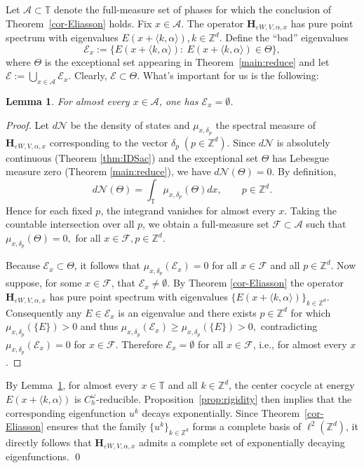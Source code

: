 \documentclass[reqno,11pt]{amsart}
\newtheorem{lemma}{Lemma}[section]
\begin{document}
Let $\mathcal{A}\subset\mathbb{T}$ denote the full-measure set of phases
for which the conclusion of Theorem~\ref{cor-Eliasson} holds.
Fix $x\in \mathcal{A}$. The operator $\mathbf H_{\varepsilon W,V,\alpha,x}$ has pure point spectrum with eigenvalues
$E(x+\langle k,\alpha\rangle), k\in\mathbb{Z}^d.$
Define the ``bad'' eigenvalues
$$\mathcal{E}_x:=\{E(x+\langle k,\alpha\rangle):\ E(x+\langle k,\alpha\rangle)\in\Theta\},$$
where $\Theta$ is the exceptional set appearing in Theorem~\ref{main:reduce} and 
let
 $\mathcal{E}:=\bigcup_{x\in\mathcal{A}}\mathcal{E}_x.$
Clearly, $\mathcal{E}\subset \Theta$. What's important for us is the following: 

\begin{lemma}\label{nonreducible}
    For almost every $x\in\mathcal{A}$, one has $\mathcal{E}_x = \emptyset$.
\end{lemma}

\begin{proof}
Let $d\mathcal{N}$ be the density of states and $\mu_{x,\delta_p}$ the spectral measure of
$\mathbf{H}_{\varepsilon W,V,\alpha,x}$  corresponding to the vector $\delta_p\;(p\in\mathbb{Z}^d)$.
Since $d\mathcal{N}$ is absolutely continuous (Theorem \ref{thm:IDSac}) and the exceptional set
$\Theta$ has Lebesgue measure zero (Theorem \ref{main:reduce}), we have $d\mathcal{N}(\Theta)=0$.  By definition,
$$
d\mathcal{N}(\Theta) = \int_{\mathbb{T}} \mu_{x,\delta_p}(\Theta) dx,
\qquad p\in\mathbb{Z}^d.
$$
Hence for each fixed $p$, the integrand vanishes for almost every $x$. Taking the
countable intersection over all $p$, we obtain a full‑measure set
$\mathcal{F}\subset\mathcal{A}$ such that
$\mu_{x,\delta_p}(\Theta) = 0, $ for all $ x\in\mathcal{F}, p\in\mathbb{Z}^d.$

Because $\mathcal{E}_x\subset\Theta$, it follows that
$\mu_{x,\delta_p}(\mathcal{E}_x)=0$ for all $x\in\mathcal{F}$ and all $p\in\mathbb{Z}^d$.
Now suppose, for some $x\in\mathcal{F}$, that $\mathcal{E}_x\neq\emptyset$. 
By Theorem \ref{cor-Eliasson} the operator $\mathbf{H}_{\varepsilon W,V,\alpha,x}$  has pure point
spectrum with eigenvalues $\{E(x+\langle k,\alpha\rangle)\}_{k\in\mathbb{Z}^d}$.
Consequently any $E\in\mathcal{E}_x$ is an eigenvalue and there exists $p\in\mathbb{Z}^d$
for which $\mu_{x,\delta_p}(\{E\})>0$ and thus
$\mu_{x,\delta_p}(\mathcal{E}_x)\ge\mu_{x,\delta_p}(\{E\})>0,$
contradicting $\mu_{x,\delta_p}(\mathcal{E}_x)=0$ for $x\in \mathcal{F}$. Therefore $\mathcal{E}_x=\emptyset$
for all $x\in\mathcal{F}$, i.e., for almost every $x$.
\end{proof}
By Lemma~\ref{nonreducible}, for almost every $x \in \mathbb{T}$ and all $k \in \mathbb{Z}^d$, the center cocycle at energy $E(x+\langle k,\alpha\rangle)$ is $C_h^\omega$-reducible. Proposition~\ref{prop:rigidity} then implies that the corresponding eigenfunction $u^k$ decays exponentially. Since Theorem~\ref{cor-Eliasson} ensures that the family $\{u^k\}_{k\in\mathbb{Z}^d}$ forms a complete basis of $\ell^2(\mathbb{Z}^d)$, it directly follows that $\mathbf{H}_{\varepsilon W,V,\alpha,x}$ admits a complete set of exponentially decaying eigenfunctions.
\qed
\end{document}
